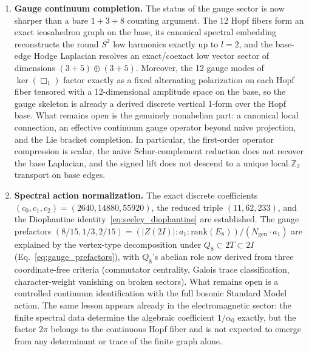 \documentclass[12pt,a4paper]{article}
\theoremstyle{definition}
\begin{document}
\begin{enumerate}
\item \textbf{Gauge continuum completion.}  The status of the gauge sector is now sharper than a bare $1+3+8$ counting argument.  The 12 Hopf fibers form an exact icosahedron graph on the base, its canonical spectral embedding reconstructs the round $S^2$ low harmonics exactly up to $l=2$, and the base-edge Hodge Laplacian resolves an exact/coexact low vector sector of dimensions $(3+5)\oplus(3+5)$.  Moreover, the 12 gauge modes of $\ker(\Box_1)$ factor exactly as a fixed alternating polarization on each Hopf fiber tensored with a 12-dimensional amplitude space on the base, so the gauge skeleton is already a derived discrete vertical 1-form over the Hopf base.  What remains open is the genuinely nonabelian part: a canonical local connection, an effective continuum gauge operator beyond naive projection, and the Lie bracket completion.  In particular, the first-order operator compression is scalar, the naive Schur-complement reduction does not recover the base Laplacian, and the signed lift does not descend to a unique local $\mathbb{Z}_2$ transport on base edges.
\item \textbf{Spectral action normalization.} The exact discrete coefficients $(c_0,c_1,c_2) = (2640,14880,55920)$, the reduced triple $(11,62,233)$, and the Diophantine identity~\eqref{eq:seeley_diophantine} are established.  The gauge prefactors $(8/15,1/3,2/15) = (|Z(2I)| : a_1 : \mathrm{rank}(E_8))/(N_{\text{gen}} \cdot a_1)$ are explained by the vertex-type decomposition under $Q_8 \subset 2T \subset 2I$ (Eq.~\ref{eq:gauge_prefactors}), with $Q_8$'s abelian role now derived from three coordinate-free criteria (commutator centrality, Galois trace classification, character-weight vanishing on broken sectors).  What remains open is a controlled continuum identification with the full bosonic Standard Model action.  The same lesson appears already in the electromagnetic sector: the finite spectral data determine the algebraic coefficient $1/\alpha_0$ exactly, but the factor $2\pi$ belongs to the continuous Hopf fiber and is not expected to emerge from any determinant or trace of the finite graph alone.

\end{enumerate}
\end{document}
